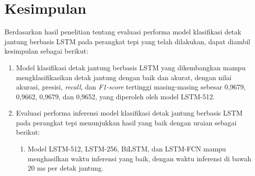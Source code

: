 





\section{Kesimpulan}
Berdasarkan hasil penelitian tentang evaluasi performa model klasifikasi detak jantung berbasis LSTM pada perangkat tepi yang telah dilakukan, dapat diambil kesimpulan sebagai berikut:
\begin{enumerate}[leftmargin=0.5cm]
  \item Model klasifikasi detak jantung berbasis LSTM yang dikembangkan mampu mengklasifikasikan detak jantung dengan baik dan akurat, dengan nilai akurasi, presisi, \emph{recall}, dan \emph{F1-score} tertinggi masing-masing sebesar 0,9679, 0,9662, 0,9679, dan 0,9652, yang diperoleh oleh model LSTM-512.
  \item Evaluasi performa inferensi model klasifikasi detak jantung berbasis LSTM pada perangkat tepi menunjukkan hasil yang baik dengan uraian sebagai berikut:
  \begin{enumerate}
    \item Model LSTM-512, LSTM-256, BiLSTM, dan LSTM-FCN mampu menghasilkan waktu inferensi yang baik, dengan waktu inferensi di bawah 20 ms per detak jantung.

\end{enumerate}
\end{enumerate}
